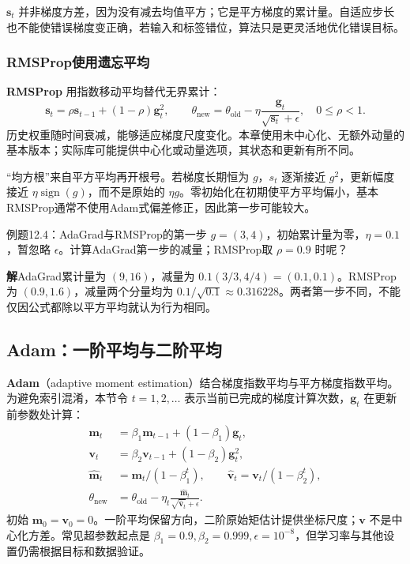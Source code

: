 \documentclass[UTF8,fontset=none,zihao=-4,a4paper]{ctexart}
\newcommand{\term}[1]{\textbf{#1}}
\newcommand{\sol}{\par\noindent\textbf{解}\quad}
\numberwithin{equation}{section}
\numberwithin{figure}{section}
\begin{document}
$\symbf s_t$ 并非梯度方差，因为没有减去均值平方；它是平方梯度的累计量。自适应步长也不能使错误梯度变正确，若输入和标签错位，算法只是更灵活地优化错误目标。

\subsubsection{RMSProp使用遗忘平均}
\term{RMSProp} 用指数移动平均替代无界累计：
\begin{equation}
 \symbf s_t=\rho\symbf s_{t-1}+(1-\rho)\symbf g_t^2,
 \qquad\theta_{\mathrm{new}}=\theta_{\mathrm{old}}-\eta\frac{\symbf g_t}{\sqrt{\symbf s_t}+\epsilon},
 \quad0\leq\rho<1.
\end{equation}
历史权重随时间衰减，能够适应梯度尺度变化。本章使用未中心化、无额外动量的基本版本；实际库可能提供中心化或动量选项，其状态和更新有所不同。

“均方根”来自平方平均再开根号。若梯度长期恒为 $g$，$s_t$ 逐渐接近 $g^2$，更新幅度接近 $\eta\operatorname{sign}(g)$，而不是原始的 $\eta g$。零初始化在初期使平方平均偏小，基本RMSProp通常不使用Adam式偏差修正，因此第一步可能较大。

\begin{infobox}{例题12.4：AdaGrad与RMSProp的第一步}
$g=(3,4)$，初始累计量为零，$\eta=0.1$，暂忽略 $\epsilon$。计算AdaGrad第一步的减量；RMSProp取 $\rho=0.9$ 时呢？
\end{infobox}
\sol AdaGrad累计量为 $(9,16)$，减量为 $0.1(3/3,4/4)=(0.1,0.1)$。RMSProp为 $(0.9,1.6)$，减量两个分量均为 $0.1/\sqrt{0.1}\approx0.316228$。两者第一步不同，不能仅因公式都除以平方平均就认为行为相同。

\subsection{Adam：一阶平均与二阶平均}
\term{Adam}（adaptive moment estimation）结合梯度指数平均与平方梯度指数平均。为避免索引混淆，本节令 $t=1,2,\ldots$ 表示当前已完成的梯度计算次数，$\symbf g_t$ 在更新前参数处计算：
\begin{align}
 \symbf m_t&=\beta_1\symbf m_{t-1}+(1-\beta_1)\symbf g_t,\\
 \symbf v_t&=\beta_2\symbf v_{t-1}+(1-\beta_2)\symbf g_t^2,\\
 \widehat{\symbf m}_t&=\symbf m_t/(1-\beta_1^t),\qquad
 \widehat{\symbf v}_t=\symbf v_t/(1-\beta_2^t),\\
 \theta_{\mathrm{new}}&=\theta_{\mathrm{old}}-\eta_t
 \frac{\widehat{\symbf m}_t}{\sqrt{\widehat{\symbf v}_t}+\epsilon}.
\end{align}
初始 $\symbf m_0=\symbf v_0=0$。一阶平均保留方向，二阶原始矩估计提供坐标尺度；$\symbf v$ 不是中心化方差。常见超参数起点是 $\beta_1=0.9,\beta_2=0.999,\epsilon=10^{-8}$，但学习率与其他设置仍需根据目标和数据验证。
\end{document}
